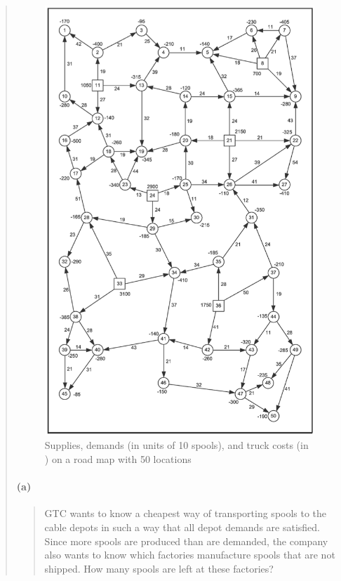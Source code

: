 \begin{quote}
\begin{figure}[H]
	\centering
	\includegraphics[scale=1]{./img/figure3-13.png}
	\caption{Supplies, demands (in units of 10 spools), and truck costs (in \texteuro) on a road map with 50 locations}
	\label{network3-1}
\end{figure}

\paragraph{(a)}
\begin{quote}
GTC wants to know a cheapest way of transporting spools to the cable depots in such a way that all depot demands are satisfied.
Since more spools are produced than are demanded, the company also wants to know which factories manufacture spools that are not shipped. How many spools are left at these factories?
\end{quote}


\end{quote}
